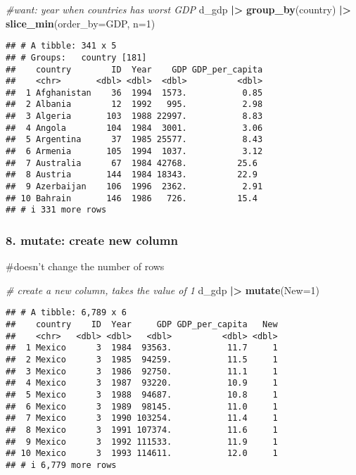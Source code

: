 \documentclass[
]{article}
\newenvironment{Shaded}{\begin{snugshade}}{\end{snugshade}}
\newcommand{\AttributeTok}[1]{\textcolor[rgb]{0.13,0.29,0.53}{#1}}
\newcommand{\CommentTok}[1]{\textcolor[rgb]{0.56,0.35,0.01}{\textit{#1}}}
\newcommand{\DecValTok}[1]{\textcolor[rgb]{0.00,0.00,0.81}{#1}}
\newcommand{\FunctionTok}[1]{\textcolor[rgb]{0.13,0.29,0.53}{\textbf{#1}}}
\newcommand{\NormalTok}[1]{#1}
\newcommand{\SpecialCharTok}[1]{\textcolor[rgb]{0.81,0.36,0.00}{\textbf{#1}}}
\begin{document}
\begin{Shaded}
\begin{Highlighting}[]
\CommentTok{\#want: year when countries has worst GDP}
\NormalTok{d\_gdp }\SpecialCharTok{|\textgreater{}}
  \FunctionTok{group\_by}\NormalTok{(country) }\SpecialCharTok{|\textgreater{}}
  \FunctionTok{slice\_min}\NormalTok{(}\AttributeTok{order\_by=}\NormalTok{GDP, }\AttributeTok{n=}\DecValTok{1}\NormalTok{)}
\end{Highlighting}
\end{Shaded}

\begin{verbatim}
## # A tibble: 341 x 5
## # Groups:   country [181]
##    country        ID  Year    GDP GDP_per_capita
##    <chr>       <dbl> <dbl>  <dbl>          <dbl>
##  1 Afghanistan    36  1994  1573.           0.85
##  2 Albania        12  1992   995.           2.98
##  3 Algeria       103  1988 22997.           8.83
##  4 Angola        104  1984  3001.           3.06
##  5 Argentina      37  1985 25577.           8.43
##  6 Armenia       105  1994  1037.           3.12
##  7 Australia      67  1984 42768.          25.6 
##  8 Austria       144  1984 18343.          22.9 
##  9 Azerbaijan    106  1996  2362.           2.91
## 10 Bahrain       146  1986   726.          15.4 
## # i 331 more rows
\end{verbatim}

\hypertarget{mutate-create-new-column}{%
\subsubsection{8. mutate: create new
column}\label{mutate-create-new-column}}

\#doesn't change the number of rows

\begin{Shaded}
\begin{Highlighting}[]
\CommentTok{\# create a new column, takes the value of 1}
\NormalTok{d\_gdp }\SpecialCharTok{|\textgreater{}} \FunctionTok{mutate}\NormalTok{(}\AttributeTok{New=}\DecValTok{1}\NormalTok{)}
\end{Highlighting}
\end{Shaded}

\begin{verbatim}
## # A tibble: 6,789 x 6
##    country    ID  Year     GDP GDP_per_capita   New
##    <chr>   <dbl> <dbl>   <dbl>          <dbl> <dbl>
##  1 Mexico      3  1984  93563.           11.7     1
##  2 Mexico      3  1985  94259.           11.5     1
##  3 Mexico      3  1986  92750.           11.1     1
##  4 Mexico      3  1987  93220.           10.9     1
##  5 Mexico      3  1988  94687.           10.8     1
##  6 Mexico      3  1989  98145.           11.0     1
##  7 Mexico      3  1990 103254.           11.4     1
##  8 Mexico      3  1991 107374.           11.6     1
##  9 Mexico      3  1992 111533.           11.9     1
## 10 Mexico      3  1993 114611.           12.0     1
## # i 6,779 more rows
\end{verbatim}
\end{document}
